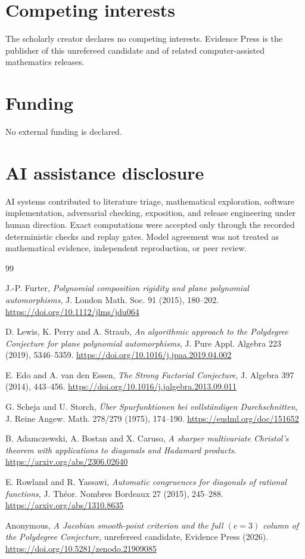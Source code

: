 \documentclass[11pt]{article}
\theoremstyle{definition}
\begin{document}
\section*{Competing interests}

The scholarly creator declares no competing interests.  Evidence Press is the
publisher of this unrefereed candidate and of related computer-assisted
mathematics releases.

\section*{Funding}

No external funding is declared.

\section*{AI assistance disclosure}

AI systems contributed to literature triage, mathematical exploration,
software implementation, adversarial checking, exposition, and release
engineering under human direction.  Exact computations were accepted only
through the recorded deterministic checks and replay gates.  Model agreement
was not treated as mathematical evidence, independent reproduction, or peer
review.

\begin{thebibliography}{99}

J.-P. Furter,
\emph{Polynomial composition rigidity and plane polynomial automorphisms},
J. London Math. Soc. 91 (2015), 180--202.
\url{https://doi.org/10.1112/jlms/jdu064}

D. Lewis, K. Perry and A. Straub,
\emph{An algorithmic approach to the Polydegree Conjecture for plane
polynomial automorphisms},
J. Pure Appl. Algebra 223 (2019), 5346--5359.
\url{https://doi.org/10.1016/j.jpaa.2019.04.002}

E. Edo and A. van den Essen,
\emph{The Strong Factorial Conjecture},
J. Algebra 397 (2014), 443--456.
\url{https://doi.org/10.1016/j.jalgebra.2013.09.011}

G. Scheja and U. Storch,
\emph{\"Uber Spurfunktionen bei vollst\"andigen Durchschnitten},
J. Reine Angew. Math. 278/279 (1975), 174--190.
\url{https://eudml.org/doc/151652}

B. Adamczewski, A. Bostan and X. Caruso,
\emph{A sharper multivariate Christol's theorem with applications to
diagonals and Hadamard products}.
\url{https://arxiv.org/abs/2306.02640}

E. Rowland and R. Yassawi,
\emph{Automatic congruences for diagonals of rational functions},
J. Th\'eor. Nombres Bordeaux 27 (2015), 245--288.
\url{https://arxiv.org/abs/1310.8635}

Anonymous,
\emph{A Jacobian smooth-point criterion and the full $(e=3)$ column of the
Polydegree Conjecture}, unrefereed candidate, Evidence Press (2026).
\url{https://doi.org/10.5281/zenodo.21909085}

\end{thebibliography}
\end{document}
